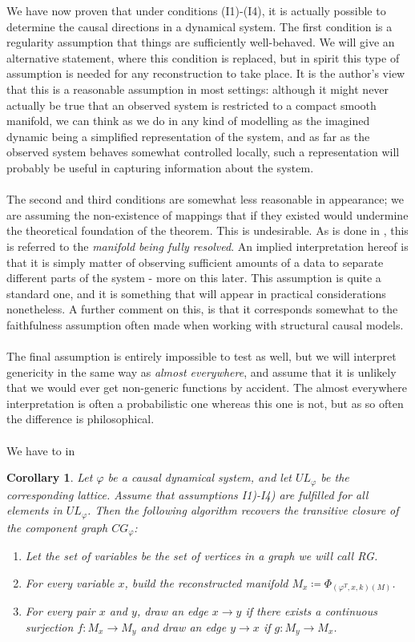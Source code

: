 \documentclass[11pt, a4paper]{memoir}
\theoremstyle{break}
\newtheorem{cor}{Corollary}
\theoremstyle{break}
\theoremstyle{nonumberplain}
\begin{document}
We have now proven that under conditions (I1)-(I4), it is actually possible to determine the causal directions in a dynamical system. The first condition is a regularity assumption that things are sufficiently well-behaved. We will give an alternative statement, where this condition is replaced, but in spirit this type of assumption is needed for any reconstruction to take place. It is the author's view that this is a reasonable assumption in most settings: although it might never actually be true that an observed system is restricted to a compact smooth manifold, we can think as we do in any kind of modelling as the imagined dynamic being a simplified representation of the system, and as far as the observed system behaves somewhat controlled locally, such a representation will probably be useful in capturing information about the system.\\\\ The second and third conditions are somewhat less reasonable in appearance; we are assuming the non-existence of mappings that if they existed would undermine the theoretical foundation of the theorem. This is undesirable. As is done in \cite{mathFound}, this is referred to the \textit{manifold being fully resolved}. An implied interpretation hereof is that it is simply matter of observing sufficient amounts of a data to separate different parts of the system - more on this later. This assumption is quite a standard one, and it is something that will appear in practical considerations nonetheless. A further comment on this, is that it corresponds somewhat to the faithfulness assumption often made when working with structural causal models.\\\\ The final assumption is entirely impossible to test as well, but we will interpret genericity in the same way as \textit{almost everywhere}, and assume that it is unlikely that we would ever get non-generic functions by accident. The almost everywhere interpretation is often a probabilistic one whereas this one is not, but as so often the difference is philosophical.\\\\
We have to in
\begin{cor}
Let $\varphi$ be a causal dynamical system, and let $UL_\varphi$ be the corresponding lattice. Assume that assumptions I1)-I4) are fulfilled for all elements in $UL_\varphi$. Then the following algorithm recovers the transitive closure of the component graph $CG_\varphi$:
\begin{enumerate}[label=\roman*.]
	\item Let the set of variables be the set of vertices in a graph we will call \emph{RG}.
	\item For every variable $x$, build the reconstructed manifold $M_x\coloneqq \Phi	_{(\varphi^T,x,k)(M)}$.
	\item For every pair $x$ and $y$, draw an edge $x\to y$ if there exists a continuous surjection $f:M_x\to M_y$ and draw an edge $y\to x$ if $g:M_y\to M_x$.
\end{enumerate}
\end{cor}
\end{document}

